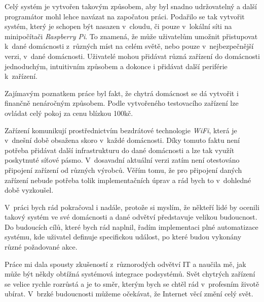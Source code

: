 Celý systém je vytvořen takovým způsobem, aby byl snadno udržovatelný a další programátor mohl lehce navázat na započatou práci.
Podařilo se tak vytvořit systém, který je schopen být nasazen v~cloudu, či pouze v~lokální síti na minipočítači \emph{Raspberry Pi}.
To znamená, že může uživatelům umožnit přistupovat k~dané domácnosti z~různých míst na celém světě, nebo pouze v~nejbezpečnější verzi, v~dané domácnosti.
Uživatelé mohou přidávat různá zařízení do domácnosti jednoduchým, intuitivním způsobem a dokonce i přidávat další periférie k~zařízení.

Zajímavým poznatkem práce byl fakt, že chytrá domácnost se dá vytvořit i finančně nenáročným způsobem.
Podle vytvořeného testovacího zařízení lze ovládat celý pokoj za cenu blízkou 100kč.

Zařízení komunikují prostřednictvím bezdrátové technologie \emph{WiFi}, která je v~dnešní době obsažena skoro v~každé domácnosti.
Díky tomuto faktu není potřeba přidávat další infrastrukturu do dané domácnosti a lze tak využít poskytnuté síťové pásmo.
V~dosavadní aktuální verzi zatím není otestováno připojení zařízení od různých výrobců.
Věřím tomu, že pro připojení daných zařízení nebude potřeba tolik implementačních úprav a rád bych to v~dohledné době vyzkoušel.

V~práci bych rád pokračoval i nadále, protože si myslím, že někteří lidé by ocenili takový systém ve své domácnosti a dané odvětví představuje velikou budoucnost.
Do budoucích cílů, které bych rád naplnil, řadím implementaci plné automatizace systému, kde uživatel definuje specifickou událost, po které budou vykonány různé požadované akce.

Práce mi dala spousty zkušeností z~různorodých odvětví IT a naučila mě, jak může být někdy obtížná systémová integrace podsystémů.
Svět chytrých zařízení se velice rychle rozrůstá a je to směr, kterým bych se chtěl rád v~profesním životě ubírat.
V~brzké budoucnosti můžeme očekávat, že Internet věcí změní celý svět.